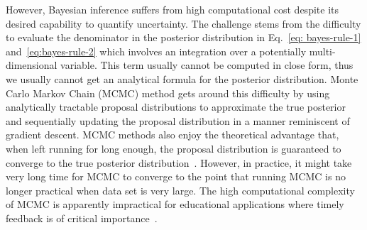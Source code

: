 \documentclass{edm_article}
\newcommand{\ml}[1]{\textcolor{orange}{\bf [LAN bandit: #1]}}
\newcommand{\jack}[1]{\textcolor{purple}{\bf [jack the ripper: #1]}}
\begin{document}
However, Bayesian inference suffers from high computational cost despite its desired capability to quantify uncertainty. The challenge stems from the difficulty to evaluate the denominator in the posterior distribution in Eq.~\ref{eq: bayes-rule-1} and~\ref{eq:bayes-rule-2} which involves an integration over a potentially multi-dimensional variable. This term usually cannot be computed in close form, thus we usually cannot get an analytical formula for the posterior distribution. Monte Carlo Markov Chain (MCMC) method gets around this difficulty by using analytically tractable proposal distributions to approximate the true posterior and sequentially updating the proposal distribution in a manner reminiscent of gradient descent. MCMC methods also enjoy the theoretical advantage that, when left running for long enough, the proposal distribution is guaranteed to converge to the true posterior distribution~\cite{gelman2013bayesian}. However, in practice, it might take very long time for MCMC to converge to the point that running MCMC is no longer practical when data set is very large. The high computational complexity of MCMC is apparently impractical for educational applications where timely feedback is of critical importance~\cite{driscoll1994psychology}. 


\end{document}
